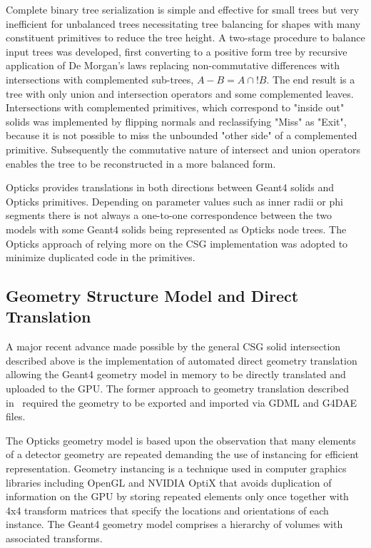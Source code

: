 \documentclass{webofc}
\begin{document}
Complete binary tree serialization is simple and effective for small trees but very inefficient 
for unbalanced trees necessitating tree balancing for shapes with many constituent primitives 
to reduce the tree height.  A two-stage procedure to balance input trees was developed, 
first converting to a positive form tree by recursive application of De Morgan's laws replacing 
non-commutative differences with intersections with complemented sub-trees, $A - B  = A \cap !B $. 
The end result is a tree with only union and intersection operators and some complemented leaves. Intersections with 
complemented primitives, which correspond to "inside out" solids was implemented by flipping normals
and reclassifying "Miss" as "Exit", because it is not possible to miss the unbounded "other side" of a 
complemented primitive.  Subsequently the commutative nature of intersect and union operators enables
the tree to be reconstructed in a more balanced form. 

Opticks provides translations in both directions between Geant4 solids and Opticks primitives.
Depending on parameter values such as inner radii or phi segments there is not always a one-to-one correspondence 
between the two models with some Geant4 solids being represented as Opticks node trees. The Opticks 
approach of relying more on the CSG implementation was adopted to minimize duplicated code in the primitives.
%
\subsection{Geometry Structure Model and Direct Translation}
%
A major recent advance made possible by the general CSG solid intersection 
described above is the implementation of automated direct geometry translation 
allowing the Geant4 geometry model in memory to be directly translated and uploaded to the GPU.
The former approach to geometry translation described in~\cite{chep2016} required the
geometry to be exported and imported via GDML and G4DAE files. 

The Opticks geometry model is based upon the observation that many elements of a detector 
geometry are repeated demanding the use of instancing for efficient representation.  Geometry instancing 
is a technique used in computer graphics libraries including OpenGL and NVIDIA OptiX that avoids 
duplication of information on the GPU by storing repeated elements only once together with 4x4 transform matrices 
that specify the locations and orientations of each instance.
The Geant4 geometry model comprises a hierarchy of volumes with associated transforms. 
\end{document}
